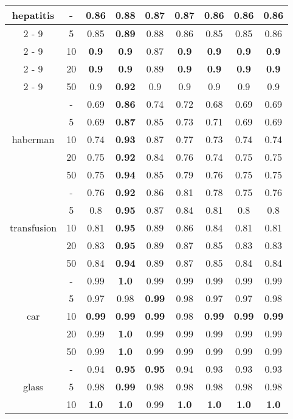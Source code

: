 \documentclass{article}%
\begin{document}
\begin{longtable}{c|c|ccccccc}
\hline%
\multirow{5}{*}{hepatitis}&{-}&0.86&\textbf{0.88}&0.87&0.87&0.86&0.86&0.86\\%
\cline{2%
-%
9}%
&5&0.85&\textbf{0.89}&0.88&0.86&0.85&0.85&0.86\\%
\cline{2%
-%
9}%
&10&\textbf{0.9}&\textbf{0.9}&0.87&\textbf{0.9}&\textbf{0.9}&\textbf{0.9}&\textbf{0.9}\\%
\cline{2%
-%
9}%
&20&\textbf{0.9}&\textbf{0.9}&0.89&\textbf{0.9}&\textbf{0.9}&\textbf{0.9}&\textbf{0.9}\\%
\cline{2%
-%
9}%
&50&0.9&\textbf{0.92}&0.9&0.9&0.9&0.9&0.9\\%
\hline%
\multirow{5}{*}{haberman}&{-}&0.69&\textbf{0.86}&0.74&0.72&0.68&0.69&0.69\\%
\cline{2%
-%
9}%
&5&0.69&\textbf{0.87}&0.85&0.73&0.71&0.69&0.69\\%
\cline{2%
-%
9}%
&10&0.74&\textbf{0.93}&0.87&0.77&0.73&0.74&0.74\\%
\cline{2%
-%
9}%
&20&0.75&\textbf{0.92}&0.84&0.76&0.74&0.75&0.75\\%
\cline{2%
-%
9}%
&50&0.75&\textbf{0.94}&0.85&0.79&0.76&0.75&0.75\\%
\hline%
\multirow{5}{*}{transfusion}&{-}&0.76&\textbf{0.92}&0.86&0.81&0.78&0.75&0.76\\%
\cline{2%
-%
9}%
&5&0.8&\textbf{0.95}&0.87&0.84&0.81&0.8&0.8\\%
\cline{2%
-%
9}%
&10&0.81&\textbf{0.95}&0.89&0.86&0.84&0.81&0.81\\%
\cline{2%
-%
9}%
&20&0.83&\textbf{0.95}&0.89&0.87&0.85&0.83&0.83\\%
\cline{2%
-%
9}%
&50&0.84&\textbf{0.94}&0.89&0.87&0.85&0.84&0.84\\%
\hline%
\multirow{5}{*}{car}&{-}&0.99&\textbf{1.0}&0.99&0.99&0.99&0.99&0.99\\%
\cline{2%
-%
9}%
&5&0.97&0.98&\textbf{0.99}&0.98&0.97&0.97&0.98\\%
\cline{2%
-%
9}%
&10&\textbf{0.99}&\textbf{0.99}&\textbf{0.99}&0.98&\textbf{0.99}&\textbf{0.99}&\textbf{0.99}\\%
\cline{2%
-%
9}%
&20&0.99&\textbf{1.0}&0.99&0.99&0.99&0.99&0.99\\%
\cline{2%
-%
9}%
&50&0.99&\textbf{1.0}&0.99&0.99&0.99&0.99&0.99\\%
\hline%
\multirow{5}{*}{glass}&{-}&0.94&\textbf{0.95}&\textbf{0.95}&0.94&0.93&0.93&0.93\\%
\cline{2%
-%
9}%
&5&0.98&\textbf{0.99}&0.98&0.98&0.98&0.98&0.98\\%
\cline{2%
-%
9}%
&10&\textbf{1.0}&\textbf{1.0}&0.99&\textbf{1.0}&\textbf{1.0}&\textbf{1.0}&\textbf{1.0}\\%

\end{longtable}
\end{document}
